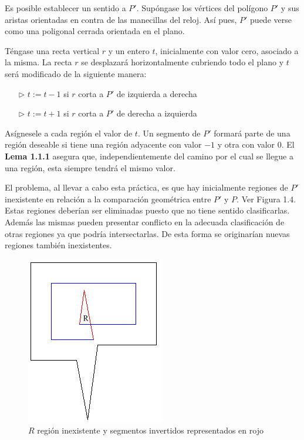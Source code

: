 \documentclass[12pt,english]{report}
\begin{document}
Es posible establecer un sentido a $P'$. Sup\'ongase los v\'ertices del pol\'igono $P'$ y sus aristas orientadas en contra de las manecillas del reloj. As\'i pues, $P'$ puede verse como una poligonal cerrada orientada en el plano.

T\'engase una recta vertical $r$ y un entero $t$, inicialmente con valor cero, asociado a la misma. La recta $r$ se desplazar\'a horizontalmente cubriendo todo el plano y $t$ ser\'a modificado de la siguiente manera:

\begin{itemize}
	\item[$\triangleright$] $t := t - 1$ si $r$ corta a $P'$ de izquierda a derecha
	\item[$\triangleright$] $t := t + 1$ si $r$ corta a $P'$ de derecha a izquierda  
\end{itemize}

As\'ignesele a cada regi\'on el valor de $t$.  Un segmento de $P'$ formar\'a parte de una regi\'on deseable si tiene una regi\'on adyacente con valor $-1$ y otra con valor $0$. El \textbf{Lema 1.1.1} asegura que, independientemente del camino por el cual se llegue a una regi\'on, esta siempre tendr\'a el mismo valor.

El problema, al llevar a cabo esta pr\'actica, es que hay inicialmente regiones de $P'$ inexistente en relaci\'on a la comparaci\'on geom\'etrica entre $P'$ y $P$. Ver Figura 1.4. Estas regiones deber\'ian ser eliminadas puesto que no tiene sentido clasificarlas. Adem\'as las mismas pueden presentar conflicto en la adecuada clasificaci\'on de otras regiones ya que podr\'ia intersectarlas. De esta forma se originar\'ian nuevas regiones tambi\'en inexistentes. 

\begin{figure}[htbp]
\begin{center}
\includegraphics{picop.jpg}%
\end{center}
\caption{$R$ regi\'on inexistente y segmentos invertidos representados en rojo}
\end{figure}
\end{document}
